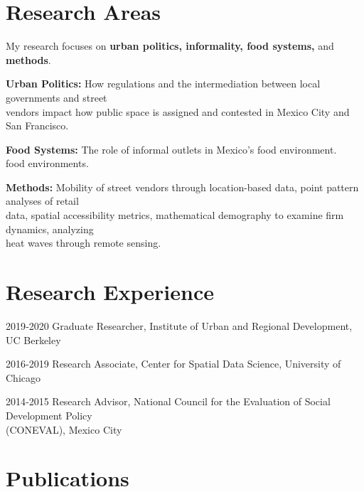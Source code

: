 \documentclass[12pt,letterpaper]{report}
\newcommand{\listitemspace}{0.25em}
\renewenvironment{itemize}
{\begin{list}{}{\setlength{\leftmargin}{0em}
                \setlength{\parskip}{0em}
                \setlength{\itemsep}{\listitemspace}
                \setlength{\parsep}{\listitemspace}}}
{\end{list}}
\begin{document}
    \section*{Research Areas}
    \begin{itemize}
\item My research focuses on \textbf{urban politics, informality, food systems,} and \textbf{methods}.

\subitem \textbf{Urban Politics:} How regulations and the intermediation between local governments and street \\
\hspace{1.5em} vendors impact how public space is assigned and contested in Mexico City and San Francisco.

\subitem \textbf{Food Systems:} The role of informal outlets in Mexico's food environment. \\
\hspace{1.5em} food environments.

\subitem \textbf{Methods:}  Mobility of street vendors through location-based data, point pattern analyses of retail\\
\hspace{1.5em} data, spatial accessibility metrics,  mathematical demography to examine firm dynamics, analyzing \\
\hspace{1.5em} heat waves through remote sensing. 
    \end{itemize}
    
    \section*{Research Experience}
    \begin{tablist}
        \item[2019‐2020] \quad{}Graduate Researcher, Institute of Urban and Regional Development, UC Berkeley
        \item[2016‐2019] \quad{}Research Associate, Center for Spatial Data Science, University of Chicago
        \item[2014‐2015] \quad{}Research Advisor, National Council for the Evaluation of Social Development Policy \\
        \hspace{1em}(CONEVAL), Mexico City
    \end{tablist}

    \section*{Publications}
\end{document}

